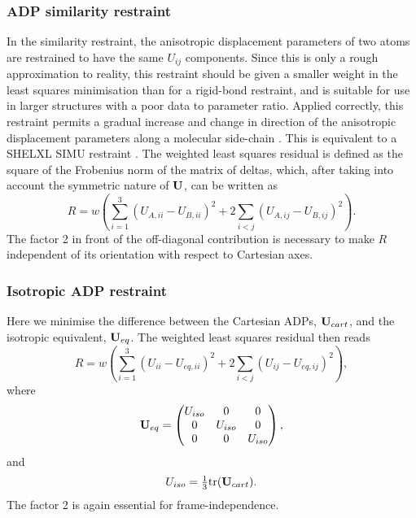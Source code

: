 \documentclass[12pt]{article}
\begin{document}


\subsubsection{ADP similarity restraint}
\label{ADP:similarity}
In the similarity restraint, the anisotropic displacement parameters of two atoms are restrained to have the same $U_{ij}$ components. Since this is only a rough approximation to reality, this restraint should be given a smaller weight in the least squares minimisation than for a rigid-bond restraint, and is suitable for use in larger structures with a poor data to parameter ratio. Applied correctly, this restraint permits a gradual increase and change in direction of the anisotropic displacement parameters along a molecular side-chain \cite{SHELX:man97}. This is equivalent to a SHELXL SIMU restraint \cite{SHELX:man97}.
The weighted least squares residual is defined as the square of the Frobenius norm of the matrix of deltas, which, after taking into account the symmetric nature of $\mathbf{U}$, can be written as
\begin{equation}
R = w \left( \sum_{i=1}^3 (U_{A,ii} - U_{B,ii})^2 + 2 \sum_{i < j} (U_{A,ij} - U_{B,ij})^2 \right) .
\end{equation}
The factor 2 in front of the off-diagonal contribution is necessary to make $R$ independent of its orientation with respect to Cartesian axes.



\subsubsection{Isotropic ADP restraint}
Here we minimise the difference between the Cartesian ADPs, $\mathbf{U}_{cart}$, and the isotropic equivalent, $\mathbf{U}_{eq}$. The weighted least squares residual then reads
\begin{equation}
R = w \left( \sum_{i=1}^3 (U_{ii} - U_{eq,ii})^2 + 2 \sum_{i<j} (U_{ij} - U_{eq,ij})^2 \right) ,
\end{equation}
where
\begin{equation}
\mathbf{U}_{eq} = 
\begin{pmatrix} U_{iso} & 0 & 0\\
  0 & U_{iso} & 0\\
  0 & 0 & U_{iso}\end{pmatrix},
\end{equation}
and
\begin{equation}
U_{iso} = \tfrac{1}{3} \mathrm{tr}(\mathbf{U}_{cart}).
\end{equation}
The factor 2 is again essential for frame-independence.
\end{document}
